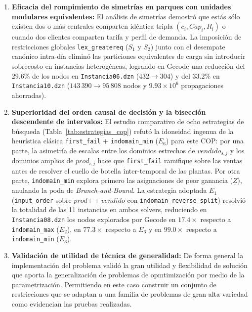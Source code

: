 \begin{enumerate}
    \item \textbf{Eficacia del rompimiento de simetrías en parques con unidades modulares equivalentes:}
    El análisis de simetrías demostró que estás sólo existen dos o más centrales comparten idéntica tripla $(c_i, Cap_i, R_i)$ o cuando dos clientes comparten tarifa y perfil de demanda. La imposición de restricciones globales \texttt{lex\_greatereq} ($S_1$ y $S_2$) junto con el desempate canónico intra-día eliminó las particiones equivalentes de carga sin introducir sobrecosto en instancias heterogéneas, logrando en Gecode una reducción del $29.6\%$ de los nodos en \texttt{Instancia06.dzn} ($432 \to 304$) y del $33.2\%$ en \texttt{Instancia10.dzn} ($143\,390 \to 95\,808$ nodos y $9.93\times 10^6$ propagaciones ahorradas).

    \item \textbf{Superioridad del orden causal de decisión y la bisección descendente de intervalos:}
    El estudio comparativo de ocho estrategias de búsqueda (Tabla~\ref{tab:estrategias_cop}) refutó la idoneidad ingenua de la heurística clásica \texttt{first\_fail} + \texttt{indomain\_min} ($E_6$) para este COP: por una parte, la asimetría de escalas entre los dominios estrechos de $vendido_{s,j}$ y los dominios amplios de $prod_{i,j}$ hace que \texttt{first\_fail} ramifique sobre las ventas antes de resolver el cuello de botella inter-temporal de las plantas. Por otra parte, \texttt{indomain\_min} explora primero las asignaciones de peor ganancia ($\underline{Z}$), anulando la poda de \emph{Branch-and-Bound}. La estrategia adoptada $E_1$ (\texttt{input\_order} sobre $prod \mathbin{+\!+} vendido$ con \texttt{indomain\_reverse\_split}) resolvió la totalidad de las 11 instancias en ambos solvers, reduciendo en \texttt{Instancia08.dzn} los nodos explorados por Gecode en $17.4\times$ respecto a \texttt{indomain\_max} ($E_2$), en $77.3\times$ respecto a $E_6$ y en $99.0\times$ respecto a \texttt{indomain\_min} ($E_3$).

    \item \textbf{Validación de utilidad de técnica de generalidad:} De forma general la implementación del problema validó la gran utilidad y flexibilidad de solución que aporta la generalización de problemas de opmtimización por medio de la parametrización. Permitiendo en este caso construir un conjunto de restricciones que se adaptan a una familia de problemas de gran alta variedad como evidencian las pruebas realizadas. 
\end{enumerate}
